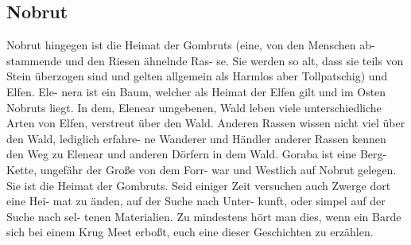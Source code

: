 \subsection{Nobrut}
Nobrut hingegen ist die Heimat
der Gombruts (eine, von den Menschen ab-
stammende und den Riesen ähnelnde Ras-
se. Sie werden so alt, dass sie teils von Stein
überzogen sind und gelten allgemein als
Harmlos aber Tollpatschig) und Elfen. Ele-
nera ist ein Baum, welcher als Heimat der
Elfen gilt und im Osten Nobruts liegt. In
dem, Elenear umgebenen, Wald leben viele
unterschiedliche Arten von Elfen, verstreut
über den Wald. Anderen Rassen wissen
nicht viel über den Wald, lediglich erfahre-
ne Wanderer und Händler anderer Rassen
kennen den Weg zu Elenear und anderen
Dörfern in dem Wald. Goraba ist eine Berg-
Kette, ungefähr der Große von dem Forr-
war und Westlich auf Nobrut gelegen. Sie
ist die Heimat der Gombruts. Seid einiger
Zeit versuchen auch Zwerge dort eine Hei-
mat zu änden, auf der Suche nach Unter-
kunft, oder simpel auf der Suche nach sel-
tenen Materialien. Zu mindestens hört man
dies, wenn ein Barde sich bei einem Krug
Meet erboßt, euch eine dieser Geschichten
zu erzählen.
